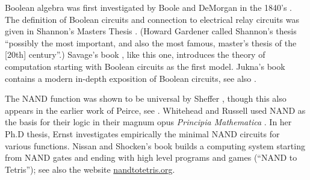 Boolean algebra was first investigated by Boole and DeMorgan in the
1840's \cite{Boole1847mathematical, DeMorgan1847}. The definition of
Boolean circuits and connection to electrical relay circuits was given
in Shannon's Masters Thesis \cite{Shannon1938}. (Howard Gardener called
Shannon's thesis ``possibly the most important, and also the most
famous, master's thesis of the {[}20th{]} century''.) Savage's book
\cite{Savage1998models}, like this one, introduces the theory of
computation starting with Boolean circuits as the first model. Jukna's
book \cite{Jukna12} contains a modern in-depth exposition of Boolean
circuits, see also \cite{wegener1987complexity}.

The NAND function was shown to be universal by Sheffer
\cite{Sheffer1913}, though this also appears in the earlier work of
Peirce, see \cite{Burks1978charles}. Whitehead and Russell used NAND as
the basis for their logic in their magnum opus \emph{Principia
Mathematica} \cite{WhiteheadRussell1912}. In her Ph.D thesis, Ernst
\cite{Ernst2009phd} investigates empirically the minimal NAND circuits
for various functions. Nissan and Shocken's book \cite{NisanShocken2005}
builds a computing system starting from NAND gates and ending with high
level programs and games (``NAND to Tetris''); see also the website
\href{https://www.nand2tetris.org/}{nandtotetris.org}.
